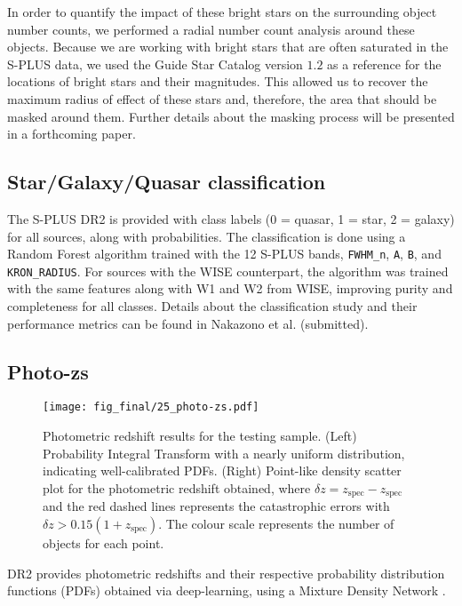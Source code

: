 \documentclass[fleqn,usenatbib]{mnras}
\begin{document}
In order to quantify the impact of these bright stars on the surrounding object number counts, we performed a radial number count analysis around these objects. Because we are working with bright stars that are often saturated in the S-PLUS data, we used the Guide Star Catalog version $1.2$ \citep[GSC 1.2, ][]{Morrison+2001} as a reference for the locations of bright stars and their magnitudes. This allowed us to recover the maximum radius of effect of these stars and, therefore, the area that should be masked around them. Further details about the masking process will be presented in a forthcoming paper.

\subsection{Star/Galaxy/Quasar classification}
The S-PLUS DR2 is provided with class labels (0 = quasar, 1 = star, 2 = galaxy) for all sources, along with probabilities. The classification is done using a Random Forest algorithm trained with the 12 S-PLUS bands, \texttt{FWHM\_n}, \texttt{A}, \texttt{B}, and \texttt{KRON\_RADIUS}. For sources with the WISE counterpart, the algorithm was trained with the same features along with W1 and W2 from WISE, improving purity and completeness for all classes. Details about the classification study and their performance metrics can be found in Nakazono et al. (submitted).

\subsection{Photo-zs}

\begin{figure*}
\begin{center}
\texttt{[image: fig\_final/25\_photo-zs.pdf]}
\caption{\label{fig:photo-zs} Photometric redshift results for the testing sample. (Left) Probability Integral Transform with a nearly uniform distribution, indicating well-calibrated PDFs. (Right) Point-like density scatter plot for the photometric redshift obtained, where $\delta z = z_\text{spec} - z_\text{spec}$ and the red dashed lines represents the catastrophic errors with  $\delta z > 0.15(1+z_\text{spec})$. The colour scale represents the number of objects for each point.}
\end{center}
\end{figure*}

DR2 provides photometric redshifts and their respective probability distribution functions (PDFs)  obtained via deep-learning, using a Mixture Density Network \citep[Vinicius-Lima et al., ][]{bishop1994mixture}.
\end{document}
